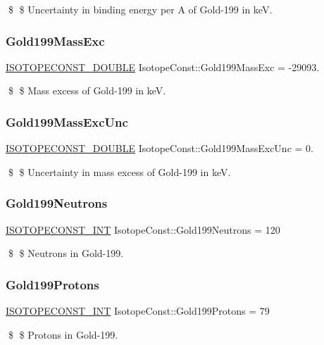 \$ \$ Uncertainty in binding energy per A of Gold-\/199 in keV. \mbox{\label{group___isotope_const-_gold-_au199_gafd670d67643adb1873815341f776da47}} 
\subsubsection{\texorpdfstring{Gold199\+Mass\+Exc}{Gold199MassExc}}
{\footnotesize\ttfamily \mbox{\hyperlink{group___isotope_const-_macros_ga8f45a7272ce02c0b4c65c44636ed719a}{I\+S\+O\+T\+O\+P\+E\+C\+O\+N\+S\+T\+\_\+\+D\+O\+U\+B\+LE}} Isotope\+Const\+::\+Gold199\+Mass\+Exc = -\/29093.}

\$ \$ Mass excess of Gold-\/199 in keV. \mbox{\label{group___isotope_const-_gold-_au199_gadf636df8e4a5a04558aa1cf1da8e7d0a}} 
\subsubsection{\texorpdfstring{Gold199\+Mass\+Exc\+Unc}{Gold199MassExcUnc}}
{\footnotesize\ttfamily \mbox{\hyperlink{group___isotope_const-_macros_ga8f45a7272ce02c0b4c65c44636ed719a}{I\+S\+O\+T\+O\+P\+E\+C\+O\+N\+S\+T\+\_\+\+D\+O\+U\+B\+LE}} Isotope\+Const\+::\+Gold199\+Mass\+Exc\+Unc = 0.}

\$ \$ Uncertainty in mass excess of Gold-\/199 in keV. \mbox{\label{group___isotope_const-_gold-_au199_ga397d1d2316e1772c22c456d78eb22f70}} 
\subsubsection{\texorpdfstring{Gold199\+Neutrons}{Gold199Neutrons}}
{\footnotesize\ttfamily \mbox{\hyperlink{group___isotope_const-_macros_ga5f18360b3e99483a35c32d789e62621c}{I\+S\+O\+T\+O\+P\+E\+C\+O\+N\+S\+T\+\_\+\+I\+NT}} Isotope\+Const\+::\+Gold199\+Neutrons = 120}

\$ \$ Neutrons in Gold-\/199. \mbox{\label{group___isotope_const-_gold-_au199_ga02c45e39d6cbd0c2a5075b4a6cd173b3}} 
\subsubsection{\texorpdfstring{Gold199\+Protons}{Gold199Protons}}
{\footnotesize\ttfamily \mbox{\hyperlink{group___isotope_const-_macros_ga5f18360b3e99483a35c32d789e62621c}{I\+S\+O\+T\+O\+P\+E\+C\+O\+N\+S\+T\+\_\+\+I\+NT}} Isotope\+Const\+::\+Gold199\+Protons = 79}

\$ \$ Protons in Gold-\/199. 